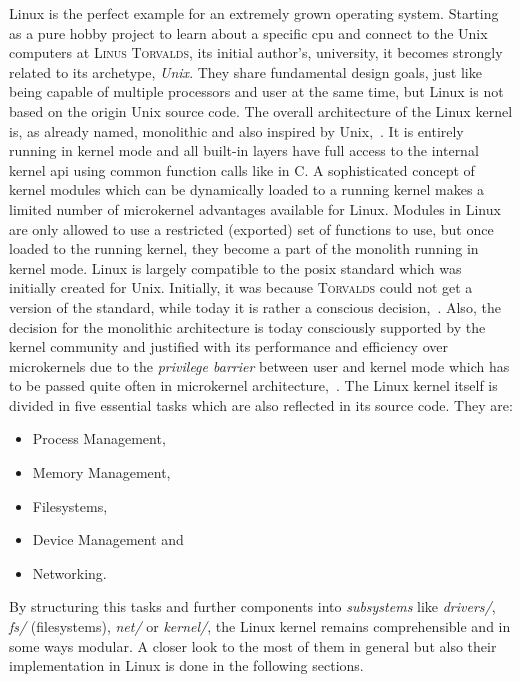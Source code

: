 Linux is the perfect example for an extremely grown operating system.
Starting as a pure hobby project to learn about a specific \ac{cpu} and connect to the Unix computers at \textsc{Linus Torvalds}, its initial author's, university, it becomes strongly related to its archetype, \textit{Unix}\cite{DiamondTorvalds2002}. 
They share fundamental design goals, just like being capable of multiple processors and user at the same time, but Linux is not based on the origin Unix source code\cite{tanenbaum-modern-operating-systems}.
The overall architecture of the Linux kernel is, as already named, monolithic and also inspired by Unix\cite{lfd430},~\cite{DiamondTorvalds2002}.
It is entirely running in kernel mode and all built-in layers have full access to the internal kernel \ac{api} using common function calls like in C.
A sophisticated concept of kernel modules which can be dynamically loaded to a running kernel makes a limited number of microkernel advantages available for Linux.
Modules in Linux are only allowed to use a restricted (exported) set of functions to use, but once loaded to the running kernel, they become a part of the monolith running in kernel mode\cite{lfd430}.
Linux is largely compatible to the \ac{posix} standard which was initially created for Unix.
Initially, it was because \textsc{Torvalds} could not get a version of the standard, while today it is rather a conscious decision\cite{DiamondTorvalds2002},~\cite{tanenbaum-modern-operating-systems}. 
Also, the decision for the monolithic architecture is today consciously supported by the kernel community and justified with its performance and efficiency over microkernels due to the \textit{privilege barrier} between user and kernel mode which has to be passed quite often in microkernel architecture\cite{why-linux-monolith},~\cite{lfd430}.
The Linux kernel itself is divided in five essential tasks which are also reflected in its source code.
They are: 
\begin{itemize}
    \item Process Management,
    \item Memory Management,
    \item Filesystems,
    \item Device Management and
    \item Networking\cite{lfd430}.
\end{itemize}
By structuring this tasks and further components into \textit{subsystems} like \textit{drivers/}, \textit{fs/} (filesystems), \textit{net/} or \textit{kernel/}, the Linux kernel remains comprehensible and in some ways modular. 
A closer look to the most of them in general but also their implementation in Linux is done in the following sections.

